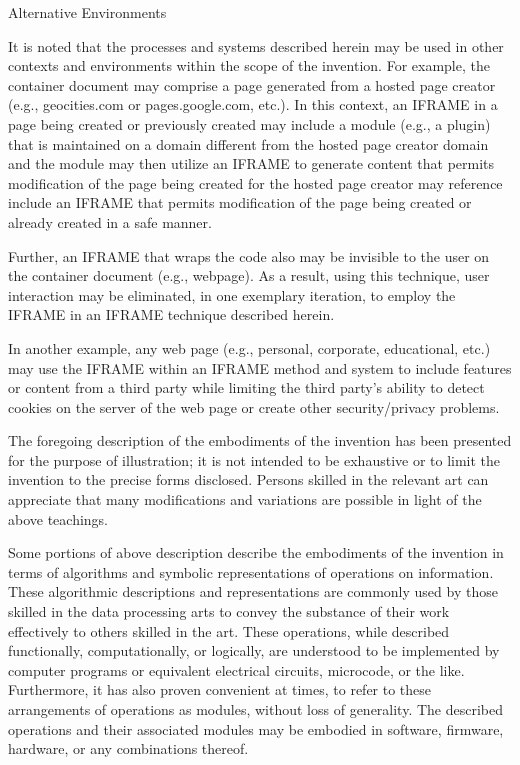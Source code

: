 Alternative Environments



It is noted
that the processes and systems described herein may be used in other
contexts and environments within the scope of the invention. For
example, the container document may comprise a page generated from a
hosted page creator (e.g., geocities.com or pages.google.com,
etc.). In this context, an IFRAME in a page being created or
previously created may include a module (e.g., a plugin) that is
maintained on a domain different from the hosted page creator domain
and the module may then utilize an IFRAME to generate content that
permits modification of the page being created for the hosted page
creator may reference include an IFRAME that permits modification of
the page being created or already created in a safe manner.



Further, an IFRAME that wraps the code also may
be invisible to the user on the container document (e.g., webpage). As
a result, using this technique, user interaction may be eliminated, in
one exemplary iteration, to employ the IFRAME in an IFRAME technique
described herein.



In another example, any web
page (e.g., personal, corporate, educational, etc.) may use the IFRAME
within an IFRAME method and system to include features or content from
a third party while limiting the third party's ability to detect
cookies on the server of the web page or create other security/privacy
problems.



The foregoing description of the
embodiments of the invention has been presented for the purpose of
illustration; it is not intended to be exhaustive or to limit the
invention to the precise forms disclosed. Persons skilled in the
relevant art can appreciate that many modifications and variations are
possible in light of the above teachings.



Some portions of above description describe the embodiments
of the invention in terms of algorithms and symbolic representations
of operations on information. These algorithmic descriptions and
representations are commonly used by those skilled in the data
processing arts to convey the substance of their work effectively to
others skilled in the art. These operations, while described
functionally, computationally, or logically, are understood to be
implemented by computer programs or equivalent electrical circuits,
microcode, or the like. Furthermore, it has also proven convenient at
times, to refer to these arrangements of operations as modules,
without loss of generality. The described operations and their
associated modules may be embodied in software, firmware, hardware, or
any combinations thereof.



